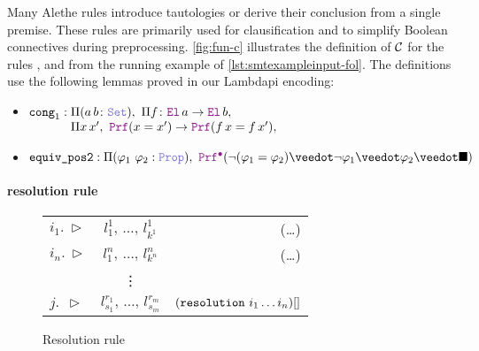 Many Alethe rules introduce tautologies or derive their conclusion from a single premise.
%
These rules are primarily used for clausification and to simplify Boolean connectives during
preprocessing.
%
\cref{fig:fun-c} illustrates the definition of $\cal{C}$ for the rules ,  and  from the running example of \cref{lst:smtexampleinput-fol}.
The definitions use the following lemmas proved in our Lambdapi encoding:
\begin{itemize}
\item $\kw{cong}_1 :
    \begin{array}[t]{@{}l@{}}
        \Pi (a\,b \colon \set),\ \Pi f \colon \el\,a \ra \el\,b, \\
        \Pi x\,x',\ \prf (x = x') \ra \prf (f\,x = f\,x'),
    \end{array}$
\item $\kw{equiv\_pos2} : \Pi (\varphi_1~\varphi_2: \prop),\ \pid (\neg (\varphi_1 = \varphi_2) \veedot \neg \varphi_1 \veedot \varphi_2 \veedot \nil )$
\end{itemize}



\paragraph{resolution rule}

\begin{figure}[t]
  \centering
  \begin{tabular}{l c r}
  $i_1.~\triangleright$  & \qquad $l_1^1,\, \dots,\, l_{k^1}^1$ \qquad & (\dots)  \\
  $i_n.~\triangleright$  & \qquad $l_1^n,\, \dots,\, l_{k^n}^n$ \qquad & (\dots) \\
    & \vdots  &  \\
  $j.~~\triangleright$  & \qquad $l_{s_1}^{r_1},\, \dots,\, l_{s_m}^{r_m}$ \qquad & $(\kw{resolution}~i_1 \dots i_n)[]$
  \end{tabular}
  \caption{Resolution rule}
  \label{fig:resolution-rule}
\end{figure}

